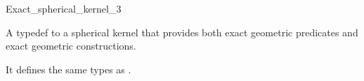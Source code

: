 \begin{ccRefClass}{Exact_spherical_kernel_3}


\ccDefinition

A typedef to a spherical kernel that provides
both exact geometric predicates and exact geometric constructions.

\medskip

It defines the same types as .

\ccIsModel


\end{ccRefClass}
